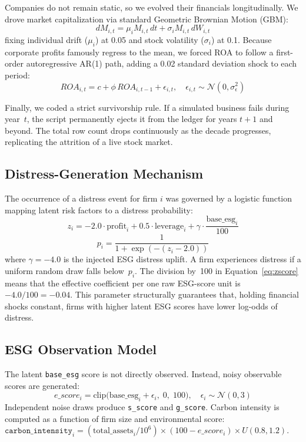 \documentclass[sigconf,anonymous]{acmart}
\begin{document}
Companies do not remain static, so we evolved their financials longitudinally. We drove market capitalization via standard Geometric Brownian Motion (GBM):
\begin{equation}
    dM_{i,t} = \mu_i M_{i,t} \, dt + \sigma_i M_{i,t} \, dW_{i,t}
\end{equation}
fixing individual drift ($\mu_i$) at 0.05 and stock volatility ($\sigma_i$) at 0.1. Because corporate profits famously regress to the mean, we forced ROA to follow a first-order autoregressive AR(1) path, adding a 0.02 standard deviation shock to each period:
\begin{equation}
    ROA_{i,t} = c + \phi \, ROA_{i,t-1} + \epsilon_{i,t}, \quad \epsilon_{i,t} \sim \mathcal{N}(0, \sigma_\epsilon^2)
\end{equation}

Finally, we coded a strict survivorship rule. If a simulated business fails during year~$t$, the script permanently ejects it from the ledger for years $t+1$ and beyond. The total row count drops continuously as the decade progresses, replicating the attrition of a live stock market.

\subsection{Distress-Generation Mechanism}
The occurrence of a distress event for firm $i$ was governed by a logistic function mapping latent risk factors to a distress probability:
\begin{equation}
    z_i = -2.0 \cdot \text{profit}_i + 0.5 \cdot \text{leverage}_i + \gamma \cdot \frac{\text{base\_esg}_i}{100}
    \label{eq:zscore}
\end{equation}
\begin{equation}
    p_i = \frac{1}{1 + \exp(-(z_i - 2.0))}
    \label{eq:logistic}
\end{equation}
where $\gamma = -4.0$ is the injected ESG distress uplift. A firm experiences distress if a uniform random draw falls below~$p_i$. The division by~100 in Equation~\ref{eq:zscore} means that the effective coefficient per one raw ESG-score unit is $-4.0 / 100 = -0.04$. This parameter structurally guarantees that, holding financial shocks constant, firms with higher latent ESG scores have lower log-odds of distress.

\subsection{ESG Observation Model}
The latent \texttt{base\_esg} score is not directly observed. Instead, noisy observable scores are generated:
\begin{equation}
    e\_score_i = \text{clip}\bigl(\text{base\_esg}_i + \epsilon_i, \; 0, \; 100\bigr), \quad \epsilon_i \sim \mathcal{N}(0, 3)
    \label{eq:esg_obs}
\end{equation}
Independent noise draws produce \texttt{s\_score} and \texttt{g\_score}. Carbon intensity is computed as a function of firm size and environmental score: $\texttt{carbon\_intensity}_i = (\text{total\_assets}_i / 10^6) \times (100 - e\_score_i) \times U(0.8, 1.2)$.
\end{document}
